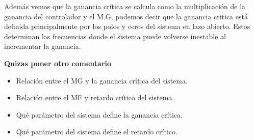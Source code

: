 Además vemos que la ganancia crítica se calcula como la multiplicación de la ganancia del controlador y el M.G, podemos decir que la ganancia critica está definida principalmente por los polos y ceros del sistema en lazo abierto. Estos determinan las frecuencias donde el sistema puede volverse inestable al incrementar la ganancia.


\textbf{Quizas poner otro comentario}
\begin{itemize}
  \item Relación entre el MG y la ganancia crítica del sistema.
  \item Relación entre el MF y retardo crítico del sistema.
  \item Qué parámetro del sistema define la ganancia crítica.
  \item Qué parámetro del sistema define el retardo crítico.
\end{itemize}

